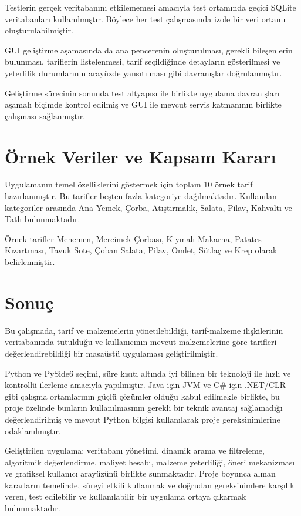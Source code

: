 \documentclass[conference]{IEEEtran}
\begin{document}
Testlerin gerçek veritabanını etkilememesi amacıyla test ortamında geçici SQLite veritabanları kullanılmıştır. Böylece her test çalışmasında izole bir veri ortamı oluşturulabilmiştir.

GUI geliştirme aşamasında da ana pencerenin oluşturulması, gerekli bileşenlerin bulunması, tariflerin listelenmesi, tarif seçildiğinde detayların gösterilmesi ve yeterlilik durumlarının arayüzde yansıtılması gibi davranışlar doğrulanmıştır.

Geliştirme sürecinin sonunda test altyapısı ile birlikte uygulama davranışları aşamalı biçimde kontrol edilmiş ve GUI ile mevcut servis katmanının birlikte çalışması sağlanmıştır.

\section{Örnek Veriler ve Kapsam Kararı}
Uygulamanın temel özelliklerini göstermek için toplam 10 örnek tarif hazırlanmıştır. Bu tarifler beşten fazla kategoriye dağılmaktadır. Kullanılan kategoriler arasında Ana Yemek, Çorba, Atıştırmalık, Salata, Pilav, Kahvaltı ve Tatlı bulunmaktadır.

Örnek tarifler Menemen, Mercimek Çorbası, Kıymalı Makarna, Patates Kızartması, Tavuk Sote, Çoban Salata, Pilav, Omlet, Sütlaç ve Krep olarak belirlenmiştir.

\section{Sonuç}
Bu çalışmada, tarif ve malzemelerin yönetilebildiği, tarif-malzeme ilişkilerinin veritabanında tutulduğu ve kullanıcının mevcut malzemelerine göre tarifleri değerlendirebildiği bir masaüstü uygulaması geliştirilmiştir.

Python ve PySide6 seçimi, süre kısıtı altında iyi bilinen bir teknoloji ile hızlı ve kontrollü ilerleme amacıyla yapılmıştır. Java için JVM ve C\# için .NET/CLR gibi çalışma ortamlarının güçlü çözümler olduğu kabul edilmekle birlikte, bu proje özelinde bunların kullanılmasının gerekli bir teknik avantaj sağlamadığı değerlendirilmiş ve mevcut Python bilgisi kullanılarak proje gereksinimlerine odaklanılmıştır.

Geliştirilen uygulama; veritabanı yönetimi, dinamik arama ve filtreleme, algoritmik değerlendirme, maliyet hesabı, malzeme yeterliliği, öneri mekanizması ve grafiksel kullanıcı arayüzünü birlikte sunmaktadır. Proje boyunca alınan kararların temelinde, süreyi etkili kullanmak ve doğrudan gereksinimlere karşılık veren, test edilebilir ve kullanılabilir bir uygulama ortaya çıkarmak bulunmaktadır.
\end{document}
